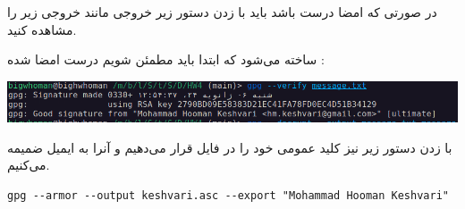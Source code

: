 در صورتی که امضا درست باشد باید با زدن دستور زیر خروجی مانند خروجی زیر را مشاهده کنید.

ساخته می‌شود که ابتدا باید مطمئن شویم درست امضا شده :
\begin{center}
    \includegraphics[scale=0.5]{pics/pgp3.png}
\end{center}

با زدن دستور زیر نیز کلید عمومی خود را در فایل 
قرار می‌دهیم و آنرا به ایمیل ضمیمه می‌کنیم.


\begin{latin}
    \begin{lstlisting}
gpg --armor --output keshvari.asc --export "Mohammad Hooman Keshvari"
\end{lstlisting}
\end{latin}
